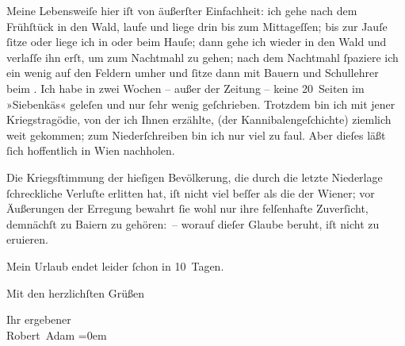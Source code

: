 \pstart
           Meine Lebensweiſe hier iſt von äußerſter Einfachheit: ich gehe nach dem Frühſtück in
               den Wald, laufe und liege drin bis zum Mittageſſen; bis zur Jauſe{ }ſitze oder liege
               ich in oder beim Hauſe; dann gehe ich wieder in den Wald und verlaſſe ihn erſt, um
               zum Nachtmahl zu gehen; nach dem Nachtmahl{ }ſpaziere ich ein wenig auf den Feldern
               umher und{ }ſitze dann mit Bauern und Schul{\pb}lehrer beim \label{K_L02289-1v}\label{K_L02289-1}. Ich habe in
               zwei Wochen – außer der Zeitung – keine 20 Seiten im »Siebenkäs« geleſen und nur{ }ſehr wenig geſchrieben. Trotzdem bin ich mit
               jener Kriegstragödie, von
                  der ich Ihnen erzählte, (der
               Kannibalengeſchichte) ziemlich weit gekommen; zum Niederſchreiben bin ich nur viel zu
               faul. Aber dieſes läßt{ }ſich hoffentlich in Wien
               nachholen.\pend
           
\pstart
           Die Kriegsſtimmung der hieſigen Bevölkerung, die durch die letzte Niederlage{ }ſchreckliche Verluſte erlitten hat, iſt nicht viel beſſer als die der Wiener; vor Äußerungen der Erregung bewahrt{ }ſie
               wohl nur ihre felſenhafte Zuverſicht, demnächſt zu Baiern zu gehören: – worauf dieſer Glaube beruht, iſt nicht zu eruieren.\pend
           
\pstart
           Mein Urlaub endet leider{ }ſchon in 10 Tagen.\pend
           
\pstart
           Mit den herzlichſten Grüßen\pend
           
\pstart
           Ihr ergebener{\\[\baselineskip]}\spacefill\mbox{Robert Adam}\pend
           \leftskip=0em{}\endnumbering{}  \newcommand{\dateiname}{L02289}\newcommand{\titel}{Robert Adam an Arthur Schnitzler, 17. 7. 1918}\newcommand{\editorInnen}{Martin Anton Müller und Gerd-Hermann Susen}
